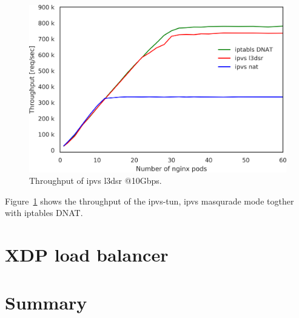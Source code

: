 \begin{figure}[t]
  \centering
  \includegraphics[width=0.8\columnwidth]{Figs/ipvs_l3dsr_10g.png}
  \caption{Throughput of ipvs l3dsr @10Gbps.}
  \label{fig:ipvs_l3dsr_10g.png}
\end{figure}

Figure~\ref{fig:ipvs_l3dsr_10g.png} shows the throughput of the ipvs-tun, ipvs masqurade mode togther with iptables DNAT.

\FloatBarrier

\section{XDP load balancer}

\section{Summary}



